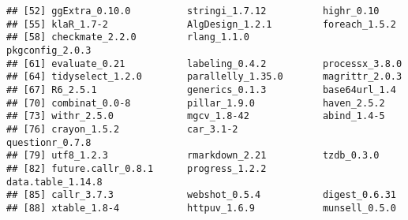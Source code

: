 \documentclass[
]{article}
\begin{document}
\begin{verbatim}
## [52] ggExtra_0.10.0          stringi_1.7.12          highr_0.10             
## [55] klaR_1.7-2              AlgDesign_1.2.1         foreach_1.5.2          
## [58] checkmate_2.2.0         rlang_1.1.0             pkgconfig_2.0.3        
## [61] evaluate_0.21           labeling_0.4.2          processx_3.8.0         
## [64] tidyselect_1.2.0        parallelly_1.35.0       magrittr_2.0.3         
## [67] R6_2.5.1                generics_0.1.3          base64url_1.4          
## [70] combinat_0.0-8          pillar_1.9.0            haven_2.5.2            
## [73] withr_2.5.0             mgcv_1.8-42             abind_1.4-5            
## [76] crayon_1.5.2            car_3.1-2               questionr_0.7.8        
## [79] utf8_1.2.3              rmarkdown_2.21          tzdb_0.3.0             
## [82] future.callr_0.8.1      progress_1.2.2          data.table_1.14.8      
## [85] callr_3.7.3             webshot_0.5.4           digest_0.6.31          
## [88] xtable_1.8-4            httpuv_1.6.9            munsell_0.5.0
\end{verbatim}
\end{document}
